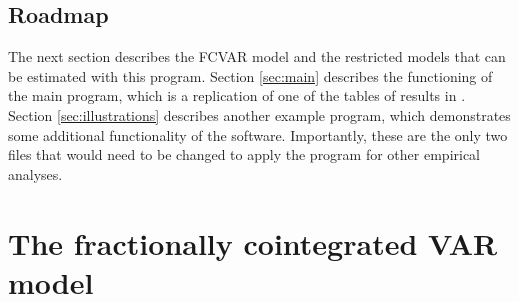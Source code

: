 \documentclass[article]{jss}
\begin{document}
\subsection{Roadmap}

The next section describes the FCVAR model and the restricted models that can be estimated with this program. Section \ref{sec:main} describes the functioning of the main program, which is a replication of one of the tables of results in \cite{JNP2014}. Section \ref{sec:illustrations} describes another example program, which demonstrates some additional functionality of the software. Importantly, these are the only two files that would need to be changed to apply the program for other empirical analyses. 




\section{The fractionally cointegrated VAR model} \label{sec:fcvar}

\end{document}
